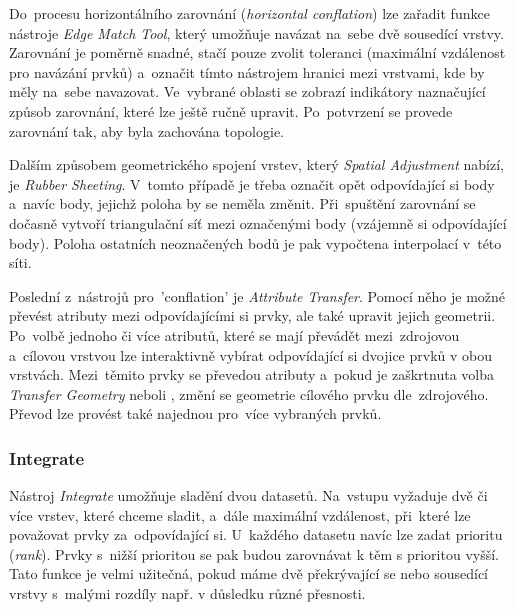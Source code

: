 Do~procesu horizontálního zarovnání (\textit{horizontal conflation}) lze zařadit funkce nástroje \textit{Edge Match Tool}, který umožňuje navázat na~sebe dvě sousedící vrstvy.
Zarovnání je poměrně snadné, stačí pouze zvolit toleranci (maximální vzdálenost pro navázání prvků) a~označit tímto nástrojem hranici mezi vrstvami, kde by měly na~sebe
navazovat. Ve~vybrané oblasti se zobrazí indikátory naznačující způsob zarovnání, které lze ještě ručně upravit. Po~potvrzení se provede zarovnání tak, aby byla zachována
topologie.

Dalším způsobem geometrického spojení vrstev, který \textit{Spatial Adjustment} nabízí, je \textit{Rubber Sheeting}. V~tomto případě je třeba označit opět odpovídající si body
a~navíc body, jejichž poloha by se neměla změnit. Při~spuštění zarovnání se dočasně vytvoří triangulační síť mezi označenými body (vzájemně si odpovídající body). Poloha 
ostatních neoznačených bodů je pak vypočtena interpolací v~této síti.

Poslední z~nástrojů pro~'conflation' je \textit{Attribute Transfer}. Pomocí něho je možné převést atributy mezi odpovídajícími si prvky, ale také upravit jejich geometrii.
Po~volbě jednoho či více atributů, které se mají převádět mezi~zdrojovou a~cílovou vrstvou lze interaktivně vybírat odpovídající si dvojice prvků v obou vrstvách. Mezi~těmito
prvky se převedou atributy a~pokud je zaškrtnuta volba \textit{Transfer Geometry} neboli , změní se geometrie cílového prvku dle~zdrojového. Převod lze
provést také najednou pro~více vybraných prvků.



\subsubsection{Integrate}

Nástroj \textit{Integrate} umožňuje sladění dvou datasetů. Na~vstupu vyžaduje dvě či více vrstev, které chceme sladit, a~dále maximální vzdálenost, při~které lze považovat
prvky za~odpovídající si. U~každého datasetu navíc lze zadat prioritu (\textit{rank}). Prvky s~nižší prioritou se pak budou zarovnávat k těm s prioritou vyšší. Tato funkce
je velmi užitečná, pokud máme dvě překrývající se nebo sousedící vrstvy s~malými rozdíly např. v důsledku různé přesnosti.

